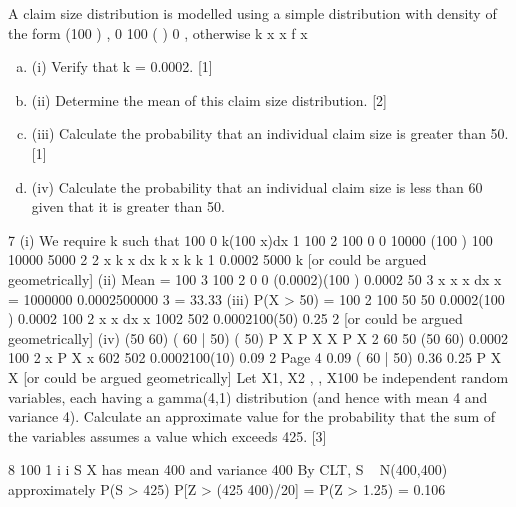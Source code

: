 \documentclass[a4paper,12pt]{article}
\begin{document}
A claim size distribution is modelled using a simple distribution with density of the
form
(100 ) , 0 100
( )
0 , otherwise
k x x
f x
\begin{enumerate}[(a)]
\item (i) Verify that k = 0.0002. [1]
\item (ii) Determine the mean of this claim size distribution. [2]
\item (iii) Calculate the probability that an individual claim size is greater than 50. [1]
\item (iv) Calculate the probability that an individual claim size is less than 60 given that
it is greater than 50. 
\end{enumerate}
7 (i) We require k such that
100
0
k(100 x)dx 1
100 2 100
0 0
10000
(100 ) 100 10000 5000
2 2
x
k x dx k x k k
1
0.0002
5000
k
[or could be argued geometrically]
(ii) Mean =
100 3 100
2
0 0
(0.0002)(100 ) 0.0002 50
3
x
x x dx x
=
1000000
0.0002{500000 }
3
= 33.33
(iii) P(X > 50) =
100 2 100
50 50
0.0002(100 ) 0.0002 100
2
x
x dx x
1002 502
0.0002{100(50) } 0.25
2
[or could be argued geometrically]
(iv)
(50 60)
( 60 | 50)
( 50)
P X
P X X
P X
2 60
50
(50 60) 0.0002 100
2
x
P X x
602 502
0.0002{100(10) } 0.09
2
Page 4
0.09
( 60 | 50) 0.36
0.25
P X X
[or could be argued geometrically]
\newpage 
Let X1, X2 , , X100 be independent random variables, each having a gamma(4,1)
distribution (and hence with mean 4 and variance 4).
Calculate an approximate value for the probability that the sum of the variables
assumes a value which exceeds 425. [3]

8
100
1
i
i
S X has mean 400 and variance 400
By CLT, S ~ N(400,400) approximately
P(S > 425) P[Z > (425 400)/20] = P(Z > 1.25) = 0.106
\end{document}
